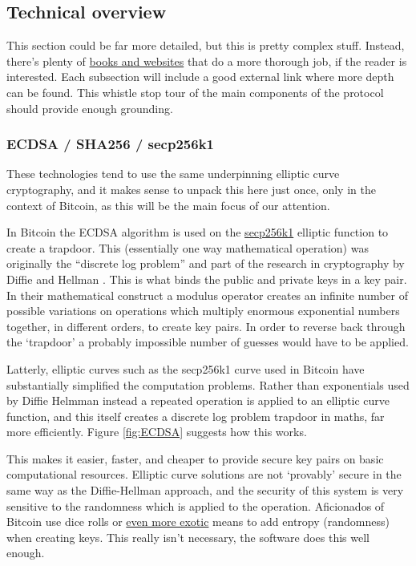 \subsection{Technical overview}
This section could be far more detailed, but this is pretty complex stuff. Instead, there's plenty of \href{https://github.com/bitcoinbook/bitcoinbook}{books and websites} that do a more thorough job, if the reader is interested. Each subsection will include a good external link where more depth can be found. This whistle stop tour of the main components of the protocol should provide enough grounding.\par
\subsubsection{ECDSA / SHA256 / secp256k1}
These technologies tend to use the same underpinning elliptic curve cryptography, and it makes sense to unpack this here just once, only in the context of Bitcoin, as this will be the main focus of our attention.\par
In Bitcoin the ECDSA algorithm is used on the \href{https://en.bitcoin.it/wiki/Secp256k1}{secp256k1} elliptic function to create a trapdoor. This (essentially one way mathematical operation) was originally the ``discrete log problem'' and part of the research in cryptography by Diffie and Hellman \cite{diffie1976new}. This is what binds the public and private keys in a key pair. In their mathematical construct a modulus operator creates an infinite number of possible variations on operations which multiply enormous exponential numbers together, in different orders, to create key pairs. In order to reverse back through the `trapdoor' a probably impossible number of guesses would have to be applied.\par
Latterly, elliptic curves such as the secp256k1 curve used in Bitcoin have substantially simplified the computation problems. Rather than exponentials used by Diffie Helmman instead a repeated operation is applied to an elliptic curve function, and this itself creates a discrete log problem trapdoor in maths, far more efficiently. Figure \ref{fig:ECDSA} suggests how this works. \par
This makes it easier, faster, and cheaper to provide secure key pairs on basic computational resources. Elliptic curve solutions are not `provably' secure in the same way as the Diffie-Hellman approach, and the security of this system is very sensitive to the randomness which is applied to the operation. Aficionados of Bitcoin use dice rolls or \href{https://www.hackster.io/news/alex-waltz-s-quantum-random-number-generator-for-bitcoin-uses-radioactive-decay-and-a-raspberry-pi-25a75316220f}{even more exotic} means to add entropy (randomness) when creating keys. This really isn't necessary, the software does this well enough.\par  
